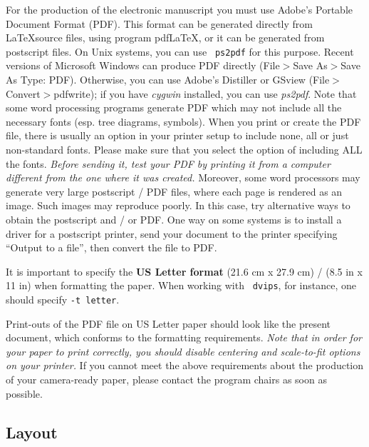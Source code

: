 \documentclass[]{article}
\begin{document}
For the production of the electronic manuscript you must use Adobe's
Portable Document Format (PDF). This format can be generated directly
from \LaTeX source files, using program pdf\LaTeX, or it can be
generated from postscript files. On Unix systems, you can use {\tt
  ps2pdf} for this purpose.  Recent versions of Microsoft Windows can
produce PDF directly (File$>$Save As$>$Save As Type: PDF). Otherwise,
you can use Adobe's Distiller or GSview (File$>$Convert$>$pdfwrite);
if you have \textit{cygwin} installed, you can use
\textit{ps2pdf}. Note that some word processing programs generate PDF
which may not include all the necessary fonts (esp. tree diagrams,
symbols). When you print or create the PDF file, there is usually an
option in your printer setup to include none, all or just non-standard
fonts.  Please make sure that you select the option of including ALL
the fonts. {\em Before sending it, test your PDF by printing it from a
  computer different from the one where it was created.} Moreover,
some word processors may generate very large postscript / PDF files,
where each page is rendered as an image. Such images may reproduce
poorly. In this case, try alternative ways to obtain the postscript
and / or PDF. One way on some systems is to install a driver for a
postscript printer, send your document to the printer specifying
``Output to a file'', then convert the file to PDF.

It is important to specify the \textbf{US Letter format} (21.6 cm x
27.9 cm) / (8.5 in x 11 in) when formatting the paper. When working with {\tt
dvips}, for instance, one should specify {\tt -t letter}.


Print-outs of the PDF file on US Letter paper should look like the
present document, which conforms to the formatting requirements. {\em
  Note that in order for your paper to print correctly, you should
  disable centering and scale-to-fit options on your printer.} If you
cannot meet the above requirements about the production of your
camera-ready paper, please contact the program chairs as soon as
possible.


\subsection{Layout}
\label{ssec:layout}
\end{document}

